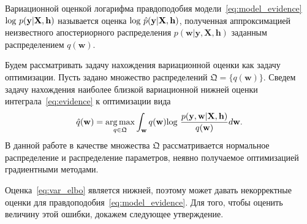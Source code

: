 {
\begin{defin} Вариационной оценкой логарифма правдоподобия модели~\eqref{eq:model_evidence} $\textnormal{log}~p(\mathbf{y}|\mathbf{X},\mathbf{h})$ называется оценка $\textnormal{log}~\hat{p}(\mathbf{y}|\mathbf{X},\mathbf{h})$, полученная аппроксимацией неизвестного апостериорного распределения $p(\mathbf{w}| \mathbf{y}, \mathbf{X}, \mathbf{h})$ заданным распределением $q(\mathbf{w})$.
\end{defin}
}


Будем рассматривать задачу нахождения вариационной оценки как задачу оптимизации. Пусть задано множество распределений $\mathfrak{Q} =\{q(\mathbf{w})\}$. Сведем задачу нахождения наиболее близкой вариационной нижней оценки интеграла~\eqref{eq:evidence} к оптимизации вида
\[
     \hat{q}(\mathbf{w}) = \operatorname*{arg\,max}_{q \in \mathfrak{Q}}  \int_{\mathbf{w}} q(\mathbf{w})\textnormal{log}~\frac{p(\mathbf{y},\mathbf{w}|\mathbf{X},\mathbf{h})}{q(\mathbf{w})}d\mathbf{w}.
\]  
В данной работе в качестве множества $\mathfrak{Q}$ рассматривается нормальное распределение и распределение параметров, неявно получаемое оптимизацией градиентными методами. 

Оценка~\eqref{eq:var_elbo} является нижней, поэтому может давать некорректные оценки для правдоподобия~\eqref{eq:model_evidence}. Для того, чтобы оценить величину этой ошибки, докажем следующее утверждение.

